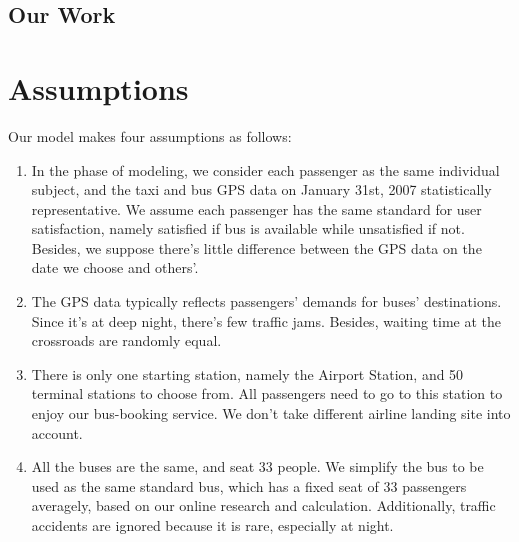 \documentclass{mcmthesis}
\begin{document}
\subsection{Our Work}







\section{Assumptions}

Our model makes four assumptions as follows:

\begin{enumerate}
	\item In the phase of modeling, we consider each passenger as the same individual subject, and the taxi and bus GPS data on January 31st, 2007 statistically representative. We assume each passenger has the same standard for user satisfaction, namely satisfied if bus is available while unsatisfied if not. Besides, we suppose there's little difference between the GPS data on the date we choose and others'.
	\item The GPS data typically reflects passengers' demands for buses' destinations. Since it's at deep night, there's few traffic jams. Besides, waiting time at the crossroads are randomly equal. 
	\item There is only one starting station, namely the Airport Station, and 50 terminal stations to choose from. All passengers need to go to this station to enjoy our bus-booking service. We don't take different airline landing site into account. 
	\item All the buses are the same, and seat 33 people. We simplify the bus to be used as the same standard bus, which has a fixed seat of 33 passengers averagely, based on our online research and calculation. Additionally, traffic accidents are ignored because it is rare, especially at night.
\end{enumerate}
\end{document}
